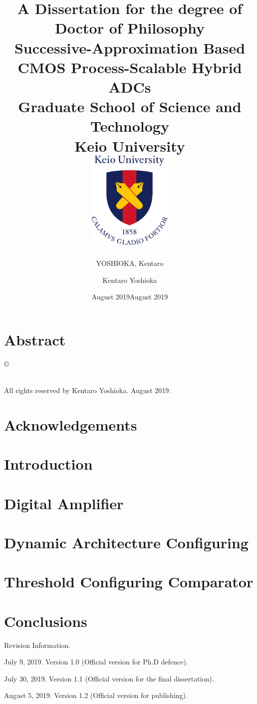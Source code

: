 \documentclass[12pt]{report}
\title{
{\large A Dissertation for the degree of }\\
{\large Doctor of Philosophy}\\
{\textbf{Successive-Approximation Based CMOS Process-Scalable Hybrid ADCs}}\\
{\large Graduate School of Science and Technology}\\
{\large Keio University}\\
{\includegraphics[width=0.3\textwidth]{1200px-Keio_University_emblem.png}}}
\author{{YOSHIOKA, Kentaro}}
\date{August 2019}
\begin{document}
\maketitle

\chapter*{Abstract}


\newpage

\newpage \thispagestyle{empty} \vspace*{\fill}
\copyright \author{Kentaro Yoshioka}
\noindent \date{August 2019} \\
\noindent All rights reserved by Kentaro Yoshioka. August 2019.
\vspace*{\fill} \newpage \rm

\chapter*{Acknowledgements}

 
\tableofcontents
\thispagestyle{empty}
\listoffigures
\listoftables
\newpage

\chapter{Introduction}

 
\chapter{Digital Amplifier}

 
\chapter{Dynamic Architecture Configuring}

 
\chapter{Threshold Configuring Comparator}

 
\chapter{Conclusions}



\printbibliography



\newpage \thispagestyle{empty} \vspace*{\fill}
\noindent Revision Information.

\noindent July 9, 2019. Version 1.0 (Official version for Ph.D defence).

\noindent July 30, 2019. Version 1.1 (Official version for the final dissertation).

\noindent August 5, 2019. Version 1.2 (Official version for publishing).
\vspace*{\fill} \newpage \rm
\end{document}
